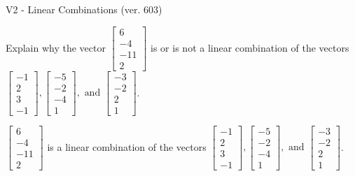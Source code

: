 \begin{exercise}
  \begin{exerciseTitle}V2 - Linear Combinations (ver. 603)\end{exerciseTitle}
  \begin{exerciseStatement}
    Explain why the vector \(\left[\begin{array}{c}
6 \\
-4 \\
-11 \\
2
\end{array}\right]\)  is or is not a linear 
	combination of the vectors \(\left[\begin{array}{c}
-1 \\
2 \\
3 \\
-1
\end{array}\right] , \left[\begin{array}{c}
-5 \\
-2 \\
-4 \\
1
\end{array}\right] , \text{ and } \left[\begin{array}{c}
-3 \\
-2 \\
2 \\
1
\end{array}\right]\).
	


  \end{exerciseStatement}
  \begin{exerciseAnswer}
   \(\left[\begin{array}{c}
6 \\
-4 \\
-11 \\
2
\end{array}\right]\) 
  	 is  
	a linear combination of the vectors \(\left[\begin{array}{c}
-1 \\
2 \\
3 \\
-1
\end{array}\right] , \left[\begin{array}{c}
-5 \\
-2 \\
-4 \\
1
\end{array}\right] , \text{ and } \left[\begin{array}{c}
-3 \\
-2 \\
2 \\
1
\end{array}\right]\).

	
  


  \end{exerciseAnswer}
\end{exercise}